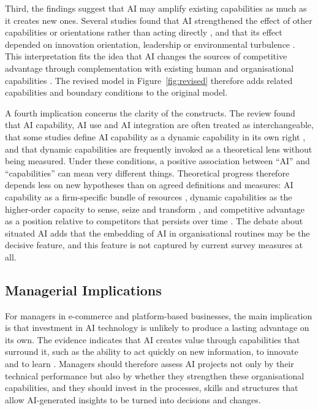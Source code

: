 Third, the findings suggest that AI may amplify existing capabilities as much as it creates new ones. Several studies found that AI strengthened the effect of other capabilities or orientations rather than acting directly \parencite{quoc2026, wang2026}, and that its effect depended on innovation orientation, leadership or environmental turbulence \parencite{texeira2026, sofiyan2026, kokash2026}. This interpretation fits the idea that AI changes the sources of competitive advantage through complementation with existing human and organisational capabilities \parencite{krakowski2023}. The revised model in Figure~\ref{fig:revised} therefore adds related capabilities and boundary conditions to the original model.

A fourth implication concerns the clarity of the constructs. The review found that AI capability, AI use and AI integration are often treated as interchangeable, that some studies define AI capability as a dynamic capability in its own right \parencite{shao2026, ayoub2026}, and that dynamic capabilities are frequently invoked as a theoretical lens without being measured. Under these conditions, a positive association between \enquote{AI} and \enquote{capabilities} can mean very different things. Theoretical progress therefore depends less on new hypotheses than on agreed definitions and measures: AI capability as a firm-specific bundle of resources \parencite{mikalef2021ai}, dynamic capabilities as the higher-order capacity to sense, seize and transform \parencite{teece2007}, and competitive advantage as a position relative to competitors that persists over time \parencite{barney1991}. The debate about situated AI \parencite{kemp2024, moser2024} adds that the embedding of AI in organisational routines may be the decisive feature, and this feature is not captured by current survey measures at all.

\subsection{Managerial Implications}
\label{sec:managerialimp}

For managers in e-commerce and platform-based businesses, the main implication is that investment in AI technology is unlikely to produce a lasting advantage on its own. The evidence indicates that AI creates value through capabilities that surround it, such as the ability to act quickly on new information, to innovate and to learn \parencite{srahin2026, malik2021, tu2026}. Managers should therefore assess AI projects not only by their technical performance but also by whether they strengthen these organisational capabilities, and they should invest in the processes, skills and structures that allow AI-generated insights to be turned into decisions and changes.

